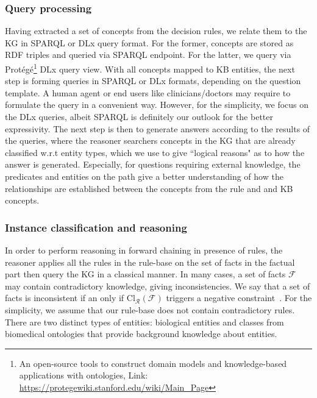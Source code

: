 \subsubsection{Query processing}
Having extracted a set of concepts from the decision rules, we relate them to the KG in SPARQL or DLx query format. For the former, concepts are stored as RDF triples and queried via SPARQL endpoint. For the latter, we query via Prot{\'e}g{\'e}\footnote{An open-source tools to construct domain models and knowledge-based applications with ontologies, Link: \url{https://protegewiki.stanford.edu/wiki/Main_Page}} DLx query view. 
With all concepts mapped to KB entities, the next step is forming queries in SPARQL or DLx formats, depending on the question template. 
A human agent or end users like clinicians/doctors may require to formulate the query in a convenient way. However, for the simplicity, we focus on the DLx queries, albeit SPARQL is definitely our outlook for the better expressivity. The next step is then to generate answers according to the results of the queries, where the reasoner searchers concepts in the KG that are already classified w.r.t entity types, which we use to give ``logical reasons" as to how the answer is generated. Especially, for questions requiring external knowledge, the predicates and entities on the path give a better understanding of how the relationships are established between the concepts from the rule and and KB concepts. 

\subsubsection{Instance classification and reasoning}
In order to perform reasoning in forward chaining in presence of rules, the reasoner applies all the rules in the rule-base on the set of facts in the factual part then query the KG in a classical manner.
In many cases, a set of facts $\mathcal{F}$ may contain contradictory knowledge, giving inconsistencies. We say that a set of facts is inconsistent if an only if  $\mathrm{Cl}_{\mathcal{R}}(\mathcal{F})$ triggers a negative constraint~\cite{garoufallou2016metadata}. For the simplicity, we assume that our rule-base does not contain contradictory rules. There are two distinct types of entities: biological entities and classes from biomedical ontologies that provide background knowledge about entities. 


